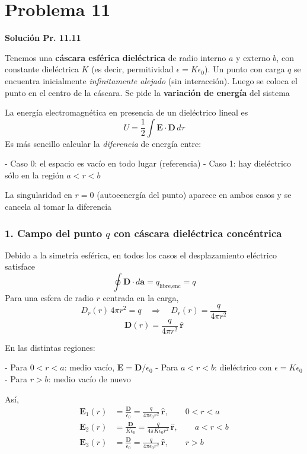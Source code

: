 \documentclass{article}
\begin{document}
\section{Problema 11}

\textcolor{Cinnabar}{\textbf{Solución Pr. 11.11}} \vspace{0.4cm}

Tenemos una \textbf{cáscara esférica dieléctrica} de radio interno $a$ y externo $b$, con constante dieléctrica $K$ (es decir, permitividad $\epsilon = K\epsilon_{0}$).  
Un punto con carga $q$ se encuentra inicialmente \emph{infinitamente alejado} (sin interacción). Luego se coloca el punto en el centro de la cáscara. Se pide la \textbf{variación de energía} del sistema

La energía electromagnética en presencia de un dieléctrico lineal es
\[
U = \frac{1}{2}\int \mathbf{E}\cdot\mathbf{D}\,d\tau
\]
Es más sencillo calcular la \emph{diferencia} de energía entre:

- Caso 0: el espacio es vacío en todo lugar (referencia)  
- Caso 1: hay dieléctrico sólo en la región $a<r<b$

La singularidad en $r=0$ (autoeenergía del punto) aparece en ambos casos y se cancela al tomar la diferencia

\subsubsection*{1. Campo del punto $q$ con cáscara dieléctrica concéntrica}

Debido a la simetría esférica, en todos los casos el desplazamiento eléctrico satisface
\begin{equation}
\oint \mathbf{D}\cdot d\mathbf{a} = q_{\text{libre,enc}} = q
\label{eq:gauss-D}
\end{equation}
Para una esfera de radio $r$ centrada en la carga,
\[
D_{r}(r)\,4\pi r^{2} = q
\quad\Rightarrow\quad
D_{r}(r) = \frac{q}{4\pi r^{2}}
\]
\begin{equation}
\mathbf{D}(r) = \frac{q}{4\pi r^{2}}\,\hat{\mathbf{r}}
\label{eq:D-radial}
\end{equation}

En las distintas regiones:

- Para $0<r<a$: medio vacío, $\mathbf{E} = \mathbf{D}/\epsilon_{0}$  
- Para $a<r<b$: dieléctrico con $\epsilon = K\epsilon_{0}$  
- Para $r>b$: medio vacío de nuevo

Así,
\begin{align}
\mathbf{E}_{1}(r) &= \frac{\mathbf{D}}{\epsilon_{0}}
= \frac{q}{4\pi\epsilon_{0}r^{2}}\,\hat{\mathbf{r}},
\qquad 0<r<a
\label{eq:E1}\\[4pt]
\mathbf{E}_{2}(r) &= \frac{\mathbf{D}}{K\epsilon_{0}}
= \frac{q}{4\pi K\epsilon_{0}r^{2}}\,\hat{\mathbf{r}},
\qquad a<r<b
\label{eq:E2}\\[4pt]
\mathbf{E}_{3}(r) &= \frac{\mathbf{D}}{\epsilon_{0}}
= \frac{q}{4\pi\epsilon_{0}r^{2}}\,\hat{\mathbf{r}},
\qquad r>b
\label{eq:E3}
\end{align}
\end{document}
